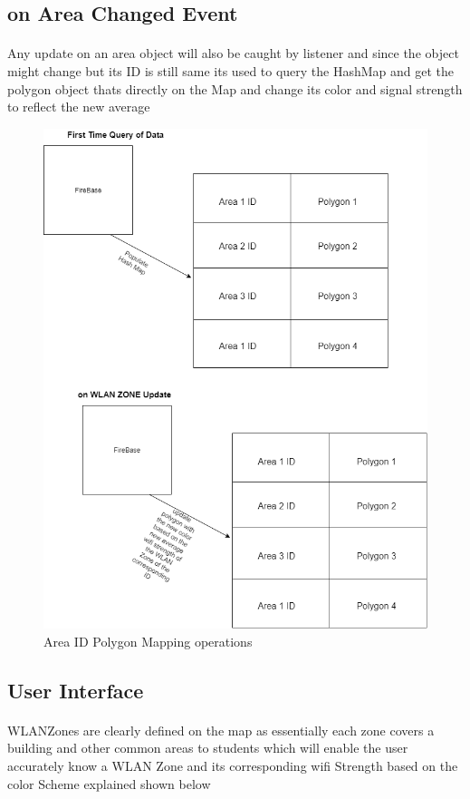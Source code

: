 \subsection*{on Area Changed Event} 
\paragraph{}Any update on an area object will also be caught by listener and since the object might change but its ID is still same its used to query the HashMap and get the polygon object thats directly on the Map and change its color and signal strength to reflect the new average 


\begin{figure}
	\centering
	\includegraphics[width=0.7\linewidth]{images/DataStructures}
	\caption{Area ID Polygon Mapping operations}
	\label{fig:datastructures}
\end{figure}


\subsection*{User Interface}
\paragraph{}WLANZones are clearly defined on the map as essentially each zone covers a building and other common areas to students which will enable the user accurately know a WLAN Zone and its corresponding wifi Strength based on the color Scheme explained shown below 

